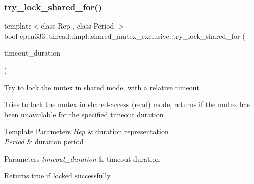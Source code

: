 \subsubsection{\texorpdfstring{try\+\_\+lock\+\_\+shared\+\_\+for()}{try\_lock\_shared\_for()}}
{\footnotesize\ttfamily template$<$class Rep , class Period $>$ \\
bool cpen333\+::thread\+::impl\+::shared\+\_\+mutex\+\_\+exclusive\+::try\+\_\+lock\+\_\+shared\+\_\+for (\begin{DoxyParamCaption}\item[{const std\+::chrono\+::duration$<$ Rep, Period $>$ \&}]{timeout\+\_\+duration }\end{DoxyParamCaption})\hspace{0.3cm}{\ttfamily [inline]}}



Try to lock the mutex in shared mode, with a relative timeout. 

Tries to lock the mutex in shared-\/access (read) mode, returns if the mutex has been unavailable for the specified timeout duration


\begin{DoxyTemplParams}{Template Parameters}
{\em Rep} & duration representation \\
\hline
{\em Period} & duration period \\
\hline
\end{DoxyTemplParams}

\begin{DoxyParams}{Parameters}
{\em timeout\+\_\+duration} & timeout duration \\
\hline
\end{DoxyParams}
\begin{DoxyReturn}{Returns}
true if locked successfully 
\end{DoxyReturn}
\mbox{\label{classcpen333_1_1thread_1_1impl_1_1shared__mutex__exclusive_ab6bf6ae1010273514d21705cccd5c19f}} 
